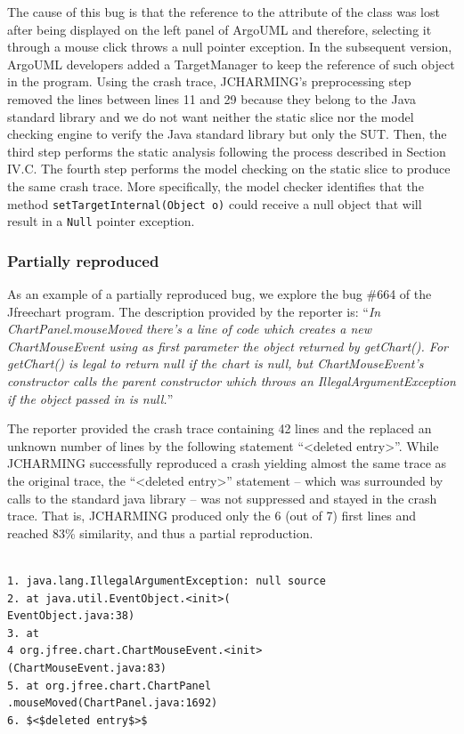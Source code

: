 The cause of this bug is that the reference to the attribute of
the class was lost after being displayed on the left panel of
ArgoUML and therefore, selecting it through a mouse click
throws a null pointer exception. In the subsequent version,
ArgoUML developers added a TargetManager to keep the
reference of such object in the program. Using the crash trace, JCHARMING's preprocessing step
removed the lines between lines 11 and 29 because they
belong to the Java standard library and we do not want neither
the static slice nor the model checking engine to verify the
Java standard library but only the SUT. Then, the third step
performs the static analysis following the process described in
Section IV.C. The fourth step performs the model checking on
the static slice to produce the same crash trace. More
specifically, the model checker identifies that the method
{\tt setTargetInternal(Object o)} could receive a null object that
will result in a {\tt Null} pointer exception.

\subsubsection{Partially reproduced}

As an example of a partially reproduced bug, we explore the
bug \#664 of the Jfreechart program. The description provided
by the reporter is: ``{\it In ChartPanel.mouseMoved there's a line
of code which creates a new ChartMouseEvent using as first
parameter the object returned by getChart(). For getChart() is
legal to return null if the chart is null, but ChartMouseEvent's
constructor calls the parent constructor which throws an
IllegalArgumentException if the object passed in is null.}''

The reporter provided the crash trace containing 42 lines and
the replaced an unknown number of lines by the following
statement ``<deleted entry>''. While JCHARMING successfully reproduced a crash yielding almost the same trace
as the original trace, the ``<deleted entry>'' statement -- which
was surrounded by calls to the standard java library -- was not
suppressed and stayed in the crash trace. That is,
JCHARMING produced only the 6 (out of 7) first lines and
reached 83\% similarity, and thus a partial reproduction.

\begin{lstlisting}

1. java.lang.IllegalArgumentException: null source
2. at java.util.EventObject.<init>(
EventObject.java:38)
3. at
4 org.jfree.chart.ChartMouseEvent.<init>
(ChartMouseEvent.java:83)
5. at org.jfree.chart.ChartPanel
.mouseMoved(ChartPanel.java:1692)
6. $<$deleted entry$>$

\end{lstlisting}

